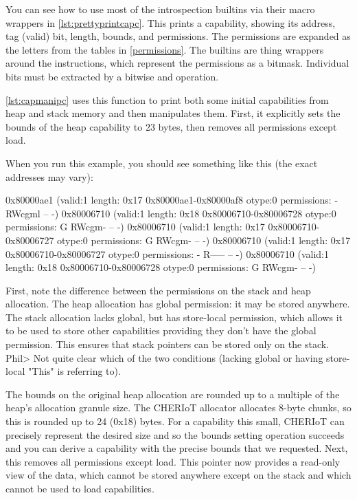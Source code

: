 {{{{{{{{You can see how to use most of the introspection builtins via their macro wrappers in \ref{lst:prettyprintcapc}.
This prints a capability, showing its address, tag (valid) bit, length, bounds, and permissions.
The permissions are expanded as the letters from the tables in \ref{permissions}.
The builtins are thing wrappers around the instructions, which represent the permissions as a bitmask.
Individual bits must be extracted by a bitwise and operation.

\codelisting[filename=examples/manipulate_capabilities_c/example.c,marker=print_capability,label=lst:prettyprintcapc,caption="Pretty printing a capability using the C builtin wrappers."]{}

\ref{lst:capmanipc} uses this function to print both some initial capabilities from heap and stack memory and then manipulates them.
First, it explicitly sets the bounds of the heap capability to 23 bytes, then removes all permissions except load.

\codelisting[filename=examples/manipulate_capabilities_c/example.c,marker=capability_manipulation,label=lst:capmanipc,caption="Manipulating capabilities using the C builtin wrappers."]{}

When you run this example, you should see something like this (the exact addresses may vary):

\begin{console}
0x80000ae1 (valid:1 length: 0x17 0x80000ae1-0x80000af8 otype:0 permissions: - RWcgml -- -)
0x80006710 (valid:1 length: 0x18 0x80006710-0x80006728 otype:0 permissions: G RWcgm- -- -)
0x80006710 (valid:1 length: 0x17 0x80006710-0x80006727 otype:0 permissions: G RWcgm- -- -)
0x80006710 (valid:1 length: 0x17 0x80006710-0x80006727 otype:0 permissions: - R----- -- -)
0x80006710 (valid:1 length: 0x18 0x80006710-0x80006728 otype:0 permissions: G RWcgm- -- -)
\end{console}

First, note the difference between the permissions on the stack and heap allocation.
The heap allocation has global permission: it may be stored anywhere.
The stack allocation lacks global, but has store-local permission, which allows it to be used to store other capabilities providing they don't have the global permission.
This ensures that stack pointers can be stored only on the stack.
Phil> Not quite clear which of the two conditions (lacking global or having store-local "This" is referring to).

The bounds on the original heap allocation are rounded up to a multiple of the heap's allocation granule size.
The CHERIoT allocator allocates 8-byte chunks, so this is rounded up to 24 (0x18) bytes.
For a capability this small, CHERIoT can precisely represent the desired size and so the bounds setting operation succeeds and you can derive a capability with the precise bounds that we requested.
Next, this removes all permissions except load.
This pointer now provides a read-only view of the data, which cannot be stored anywhere except on the stack and which cannot be used to load capabilities.

}}}}}}}}
